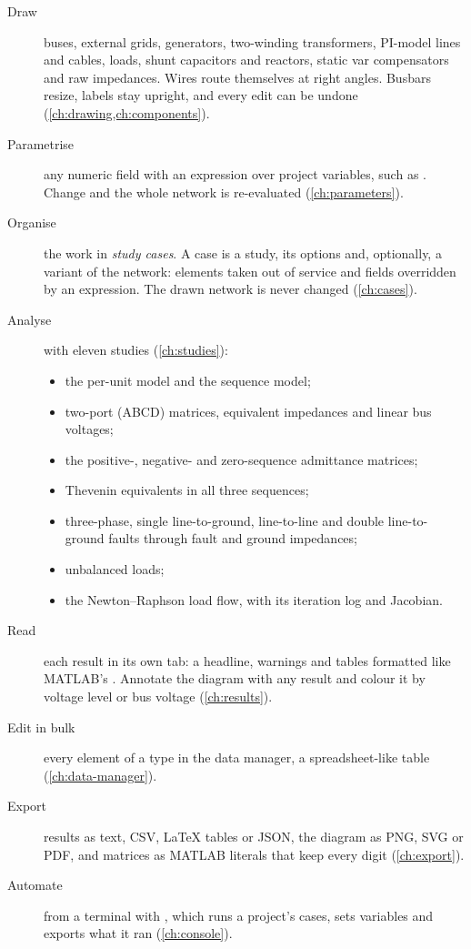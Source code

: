 \begin{description}
  \item[Draw] buses, external grids, generators, two-winding transformers, PI-model lines
    and cables, loads, shunt capacitors and reactors, static var compensators and raw
    impedances. Wires route themselves at right angles. Busbars resize, labels stay
    upright, and every edit can be undone (\cref{ch:drawing,ch:components}).
  \item[Parametrise] any numeric field with an expression over project variables, such as
    . Change  and the whole network is re-evaluated
    (\cref{ch:parameters}).
  \item[Organise] the work in \emph{study cases}. A case is a study, its options and,
    optionally, a variant of the network: elements taken out of service and fields
    overridden by an expression. The drawn network is never changed (\cref{ch:cases}).
  \item[Analyse] with eleven studies (\cref{ch:studies}):
    \begin{itemize}
      \item the per-unit model and the sequence model;
      \item two-port (ABCD) matrices, equivalent impedances and linear bus voltages;
      \item the positive-, negative- and zero-sequence admittance matrices;
      \item Thevenin equivalents in all three sequences;
      \item three-phase, single line-to-ground, line-to-line and double line-to-ground
        faults through fault and ground impedances;
      \item unbalanced loads;
      \item the Newton--Raphson load flow, with its iteration log and Jacobian.
    \end{itemize}
  \item[Read] each result in its own tab: a headline, warnings and tables formatted like
    MATLAB's . Annotate the diagram with any result and colour it by
    voltage level or bus voltage (\cref{ch:results}).
  \item[Edit in bulk] every element of a type in the data manager, a spreadsheet-like
    table (\cref{ch:data-manager}).
  \item[Export] results as text, CSV, LaTeX tables or JSON, the diagram as PNG, SVG or
    PDF, and matrices as MATLAB literals that keep every digit (\cref{ch:export}).
  \item[Automate] from a terminal with , which runs a project's
    cases, sets variables and exports what it ran (\cref{ch:console}).
\end{description}

